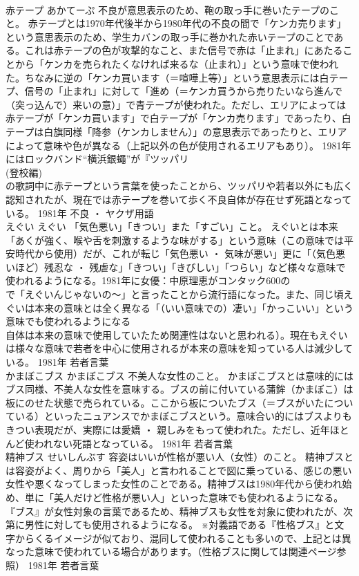 \documentclass[8pt]{extreport}
\begin{document}
\begin{CJK}{UTF8}{min}
\\	赤テープ	あかてーぷ	不良が意思表示のため、鞄の取っ手に巻いたテープのこと。	赤テープとは1970年代後半から1980年代の不良の間で「ケンカ売ります」という意思表示のため、学生カバンの取っ手に巻かれた赤いテープのことである。これは赤テープの色が攻撃的なこと、また信号で赤は「止まれ」にあたることから「ケンカを売られたくなければ来るな（止まれ）」という意味で使われた。ちなみに逆の「ケンカ買います（＝喧嘩上等）」という意思表示には白テープ、信号の「止まれ」に対して「進め（＝ケンカ買うから売りたいなら進んで（突っ込んで）来いの意）」で青テープが使われた。ただし、エリアによっては赤テープが「ケンカ買います」で白テープが「ケンカ売ります」であったり、白テープは白旗同様「降参（ケンカしません）」の意思表示であったりと、エリアによって意味や色が異なる（上記以外の色が使用されるエリアもあり）。 1981年にはロックバンド“横浜銀蠅”が『ツッパリ
\\	(登校編) 
\\	の歌詞中に赤テープという言葉を使ったことから、ツッパリや若者以外にも広く認知されたが、現在では赤テープを巻いて歩く不良自体が存在せず死語となっている。	1981年	不良 ・ ヤクザ用語	
\\	えぐい	えぐい	「気色悪い」「きつい」また「すごい」こと。	えぐいとは本来「あくが強く、喉や舌を刺激するような味がする」という意味（この意味では平安時代から使用）だが、これが転じ「気色悪い ・ 気味が悪い」更に「（気色悪いほど）残忍な ・ 残虐な」「きつい」「きびしい」「つらい」など様々な意味で使われるようになる。1981年に女優：中原理恵がコンタック600の
\\	で「えぐいんじゃないの～」と言ったことから流行語になった。また、同じ頃えぐいは本来の意味とは全く異なる「（いい意味での）凄い」「かっこいい」という意味でも使われるようになる
\\	自体は本来の意味で使用していたため関連性はないと思われる）。現在もえぐいは様々な意味で若者を中心に使用されるが本来の意味を知っている人は減少している。	1981年	若者言葉	
\\	かまぼこブス	かまぼこブス	不美人な女性のこと。	かまぼこブスとは意味的にはブス同様、不美人な女性を意味する。ブスの前に付いている蒲鉾（かまぼこ）は板にのせた状態で売られている。ここから板についたブス（＝ブスがいたについている）といったニュアンスでかまぼこブスという。意味合い的にはブスよりもきつい表現だが、実際には愛嬌 ・ 親しみをもって使われた。ただし、近年ほとんど使われない死語となっている。	1981年	若者言葉	
\\	精神ブス	せいしんぶす	容姿はいいが性格が悪い人（女性）のこと。	精神ブスとは容姿がよく、周りから「美人」と言われることで図に乗っている、感じの悪い女性や悪くなってしまった女性のことである。精神ブスは1980年代から使われ始め、単に「美人だけど性格が悪い人」といった意味でも使われるようになる。『ブス』が女性対象の言葉であるため、精神ブスも女性を対象に使われたが、次第に男性に対しても使用されるようになる。 ※対義語である『性格ブス』と文字からくるイメージが似ており、混同して使われることも多いので、上記とは異なった意味で使われている場合があります。（性格ブスに関しては関連ページ参照）	1981年	若者言葉	

\end{CJK}
\end{document}
